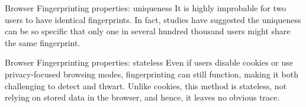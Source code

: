 \begin{frame}{Browser Fingerprinting properties: uniqueness} 
  It is highly improbable for two users to have identical fingerprints.
  In fact, studies have suggested the uniqueness can be so specific that only one in several hundred thousand users might share the same fingerprint.
\end{frame}

\begin{frame}{Browser Fingerprinting properties: stateless}
  Even if users disable cookies or use privacy-focused browsing modes, fingerprinting can still function, making it both challenging to detect and thwart.
  Unlike cookies, this method is stateless, not relying on stored data in the browser, and hence, it leaves no obvious trace.
\end{frame}